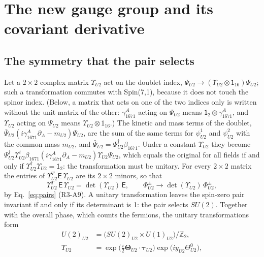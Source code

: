 \section{The new gauge group and its covariant derivative}
\label{sec:gauge}

\subsection{The symmetry that the pair selects}

Let a $2\times2$ complex matrix $\Upsilon_{U2}$ act on the doublet index,
$\Psi_{U2}\to(\Upsilon_{U2}\otimes\mathsf 1_{16})\Psi_{U2}$; such a transformation commutes with
Spin(7,1), because it does not touch the spinor index. (Below, a matrix that acts on one of the two
indices only is written without the unit matrix of the other: $\gamma^A_{1671}$ acting on
$\Psi_{U2}$ means $\mathsf 1_2\otimes\gamma^A_{1671}$, and $\Upsilon_{U2}$ acting on $\Psi_{U2}$ means
$\Upsilon_{U2}\otimes\mathsf 1_{16}$.) The kinetic and mass terms of the doublet,
$\bar\Psi_{U2}(i\gamma^A_{1671}\partial_A-m_{U2})\Psi_{U2}$, are the sum of the same terms for
$\psi^1_{U2}$ and $\psi^2_{U2}$ with the common mass $m_{U2}$, and $\bar\Psi_{U2}=
\Psi^\dagger_{U2}\beta_{1671}$. Under a constant $\Upsilon_{U2}$ they become
$\Psi^\dagger_{U2}\Upsilon^\dagger_{U2}\beta_{1671}(i\gamma^A_{1671}\partial_A-m_{U2})\Upsilon_{U2}\Psi_{U2}$,
which equals the original for all fields if and only if
$\Upsilon^\dagger_{U2}\Upsilon_{U2}=\mathsf 1_2$: the transformation must be unitary. For every $2\times2$ matrix the entries of $\Upsilon^T_{U2}\mathsf E\,\Upsilon_{U2}$ are its
$2\times2$ minors, so that
\begin{equation}
\Upsilon^T_{U2}\,\mathsf E\,\Upsilon_{U2}=\det(\Upsilon_{U2})\,\mathsf E,
\qquad
\Phi^\pm_{U2}\to\det(\Upsilon_{U2})\,\Phi^\pm_{U2},
\label{eq:detE}
\end{equation}
by Eq.~\eqref{eq:pairs} (R3-A9). A unitary transformation leaves the spin-zero pair invariant if
and only if its determinant is 1: the pair selects $SU(2)$. Together with the overall phase,
which counts the fermions, the unitary transformations form
\begin{equation}
\begin{aligned}
U(2)_{U2}&=\big(SU(2)_{U2}\times U(1)_{U2}\big)/\mathbb Z_2,\\
\Upsilon_{U2}&=\exp\!\big(\tfrac i2\boldsymbol\Theta_{U2}\cdot\boldsymbol\tau_{U2}\big)\exp\!\big(iy_{U2}\Theta^0_{U2}\big),
\end{aligned}
\label{eq:group}
\end{equation}
